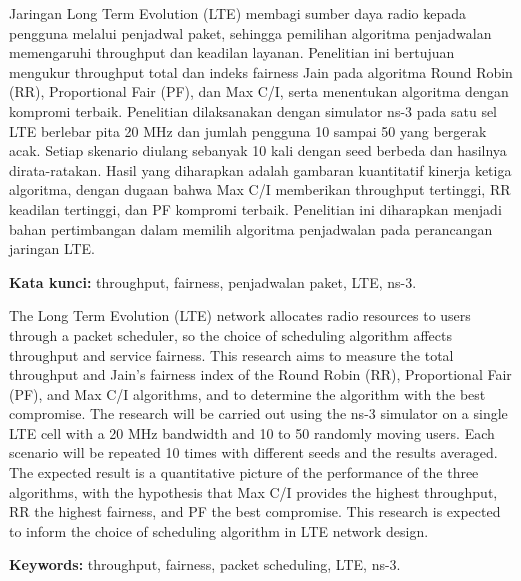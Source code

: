 \begin{abstrak}
Jaringan Long Term Evolution (LTE) membagi sumber daya radio kepada pengguna melalui penjadwal paket, sehingga pemilihan algoritma penjadwalan memengaruhi throughput dan keadilan layanan. Penelitian ini bertujuan mengukur throughput total dan indeks fairness Jain pada algoritma Round Robin (RR), Proportional Fair (PF), dan Max C/I, serta menentukan algoritma dengan kompromi terbaik. Penelitian dilaksanakan dengan simulator ns-3 pada satu sel LTE berlebar pita 20 MHz dan jumlah pengguna 10 sampai 50 yang bergerak acak. Setiap skenario diulang sebanyak 10 kali dengan seed berbeda dan hasilnya dirata-ratakan. Hasil yang diharapkan adalah gambaran kuantitatif kinerja ketiga algoritma, dengan dugaan bahwa Max C/I memberikan throughput tertinggi, RR keadilan tertinggi, dan PF kompromi terbaik. Penelitian ini diharapkan menjadi bahan pertimbangan dalam memilih algoritma penjadwalan pada perancangan jaringan LTE.

\textbf{Kata kunci:} throughput, fairness, penjadwalan paket, LTE, ns-3.
\end{abstrak}

\begin{halamanbaru}\end{halamanbaru}
\begin{abstrak}
The Long Term Evolution (LTE) network allocates radio resources to users through a packet scheduler, so the choice of scheduling algorithm affects throughput and service fairness. This research aims to measure the total throughput and Jain's fairness index of the Round Robin (RR), Proportional Fair (PF), and Max C/I algorithms, and to determine the algorithm with the best compromise. The research will be carried out using the ns-3 simulator on a single LTE cell with a 20 MHz bandwidth and 10 to 50 randomly moving users. Each scenario will be repeated 10 times with different seeds and the results averaged. The expected result is a quantitative picture of the performance of the three algorithms, with the hypothesis that Max C/I provides the highest throughput, RR the highest fairness, and PF the best compromise. This research is expected to inform the choice of scheduling algorithm in LTE network design.

\textbf{Keywords:} throughput, fairness, packet scheduling, LTE, ns-3.
\end{abstrak}

\begin{halamanbaru}\end{halamanbaru}
